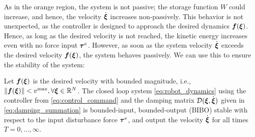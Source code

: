 As in the orange region, the system is not passive; the storage function $W$ could increase, and hence, the velocity $\dot {\boldsymbol{\xi}}$ increases non-passively. This behavior is not unexpected, as the controller is designed to approach the desired dynamics $\boldsymbol{f}({\boldsymbol{\xi}})$. Hence, as long as the desired velocity is not reached, the kinetic energy increases even with no force input $\boldsymbol{\tau}^e$. However, as soon as the system velocity $\dot{\boldsymbol{\xi}}$ exceeds the desired velocity $\boldsymbol{f}(\boldsymbol{\xi})$, the system behaves passively. We can use this to ensure the stability of the system:

\else
{}
\fi

\begin{theorem}  \label{theorem:passivity}
  Let $\boldsymbol{f}(\boldsymbol{\xi})$ is the desired velocity with bounded magnitude, i.e., $\| \boldsymbol{f}(\boldsymbol{\xi}) \| < v^{\mathrm{max}}, \forall \boldsymbol{\xi} \in \mathbb{R}^N$.
  The closed loop system \eqref{eq:robot_dynamics} using the controller from \eqref{eq:control_command} and the damping matrix $\mathcal{D}(\boldsymbol{\xi}, \dot{\boldsymbol{\xi}})$ given in \eqref{eq:damping_summation} is bounded-input, bounded-output (BIBO) stable with respect to the input disturbance force $\boldsymbol{\tau}^e$, and output the velocity $\dot{\boldsymbol{\xi}}$ for all times $T = 0, ...,  \infty$.
\end{theorem}

